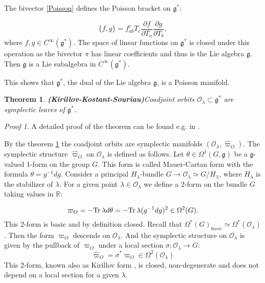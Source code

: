 \documentclass[11pt]{report}
\theoremstyle{plain}
\newtheorem{thm}{Theorem}[section]
\theoremstyle{definition}
\theoremstyle{remark}
\theoremstyle{remark}
\newtheorem*{pr}{Proof}
\numberwithin{equation}{section}
\begin{document}
 The bivector \eqref{Poisson} defines the Poisson bracket on $\mathfrak{g}^*$:

 \begin{equation}
 \{f,g\} = f_{ab}^c T_c \frac{\partial f}{\partial T_a} \frac{\partial g}{\partial T_b},
 \end{equation}
 where $f, g \in C^\infty(\mathfrak{g}^*)$. The space of linear functions on $\mathfrak{g}^*$ is closed under this operation as the bivector $\pi$ has linear coefficients and thus is the Lie algebra $\mathfrak{g}$. Then $\mathfrak{g}$ is a Lie subalgebra in $C^\infty(\mathfrak{g}^*)$. 
 
 This shows that $\mathfrak{g}^*$, the dual of the Lie algebra $\mathfrak{g}$, is a Poisson manifold.
 
 \begin{thm}{\textbf{(Kirillov-Kostant-Souriau)}}\label{KKS}
 Coadjoint orbits $\mathcal{O}_\lambda \subset \mathfrak{g}^*$ are symplectic leaves of $\mathfrak{g}^*$.
 \end{thm}
 
 \begin{pr}
 A detailed proof of the theorem can be found e.g. in \cite{Kirusha}.
 \end{pr}
 
By the theorem \ref{KKS} the coadjoint orbits are symplectic manifolds $(\mathcal{O}_\lambda,\hat{\varpi}_O)$. The symplectic structure $\hat{\varpi}_O$ on $\mathcal{O}_\lambda$  is defined as follows. Let $\theta \in \Omega^1(G, \mathfrak{g})$ be a $\mathfrak{g}$-valued 1-form on the group $G$. This form is called Mauer-Cartan form with the formula $\theta = g^{-1}dg$. 
Consider a principal $H_\lambda$-bundle $G \to \mathcal{O}_\lambda \simeq G/H_\lambda$, where $H_\lambda$ is the stabilizer of $\lambda$.
For a given point $\lambda \in \mathcal{O}_\lambda$ we define a 2-form on the bundle $G$ taking values in $\mathbb{R}$:

\begin{equation}\label{SonG}
\varpi_O = -  {\rm Tr} \, \lambda d \theta =  - {\rm Tr} \, \lambda(g^{-1}dg)^2 \in \Omega^2(G).
\end{equation}
This 2-form is basic and by definition closed. Recall that $\Omega^*(G)_{basic} \simeq \Omega^*(\mathcal{O}_\lambda)$. Then the form $\varpi_O$ descends on $\mathcal{O}_\lambda$. And the symplectic structure on $\mathcal{O}_\lambda$ is given by the pullback of $\varpi_O$ under a local section $\sigma: \mathcal{O}_\lambda \to G$:
\begin{equation}
\hat{\varpi}_O = \sigma^* \varpi_O \in \Omega^2(\mathcal{O}_\lambda)
\end{equation}
This 2-form, known also as Kirillov form \cite{Kirusha}, is closed, non-degenerate and does not depend on a local section for a given $\lambda$. 
\end{document}
